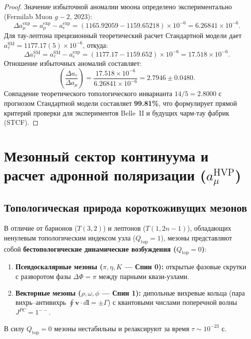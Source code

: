 \documentclass[12pt,a4paper]{article}
\begin{document}
\begin{proof}
Значение избыточной аномалии мюона определено экспериментально (Fermilab Muon $g-2$, 2023):
	\begin{equation}
	\Delta a_\mu^{\text{exp}} = a_\mu^{\text{exp}} - a_e^{\text{exp}} = (1165.92059 - 1159.65218) \times 10^{-6} = 6.26841 \times 10^{-6}.
	\end{equation}
	Для тау-лептона прецизионный теоретический расчет Стандартной модели дает $a_\tau^{\text{SM}} = 1177.17(5) \times 10^{-6}$, откуда:
	\begin{equation}
	\Delta a_\tau^{\text{SM}} = a_\tau^{\text{SM}} - a_e^{\text{exp}} = (1177.17 - 1159.652) \times 10^{-6} = 17.518 \times 10^{-6}.
\end{equation}
Отношение избыточных аномалий составляет:
	\begin{equation}
	\left( \frac{\Delta a_\tau}{\Delta a_\mu} \right) = \frac{17.518 \times 10^{-6}}{6.26841 \times 10^{-6}} = \mathbf{2.7946 \pm 0.0480}.
	\end{equation}
	Совпадение теоретического топологического инварианта $14/5 = 2.8000$ с прогнозом Стандартной модели составляет \textbf{99.81\%}, что формулирует прямой критерий проверки для экспериментов Belle~II и будущих чарм-тау фабрик (STCF).
	\end{proof}
	
\section{Мезонный сектор континуума и расчет адронной поляризации ($a_\mu^{\text{HVP}}$)}
	
	\subsection{Топологическая природа короткоживущих мезонов}
	В отличие от барионов ($T(3,2)$) и лептонов ($T(1, 2n-1)$), обладающих ненулевым топологическим индексом узла ($Q_{\text{top}} = 1$), мезоны представляют собой \textbf{бестопологические динамические возбуждения ($Q_{\text{top}} = 0$)}:
	\begin{enumerate}
		\item \textbf{Псевдоскалярные мезоны ($\pi, \eta, K$ --- Спин 0):} открытые фазовые скрутки с разворотом фазы $\Delta \Phi = \pi$ между парными квази-узлами.
		\item \textbf{Векторные мезоны ($\rho, \omega, \phi$ --- Спин 1):} дипольные вихревые кольца (пара вихрь--антивихрь $\oint \mathbf{v} \cdot d\mathbf{l} = \pm \Gamma$) с квантовыми числами поперечной волны $J^{PC} = 1^{--}$.
	\end{enumerate}
	В силу $Q_{\text{top}} = 0$ мезоны нестабильны и релаксируют за время $\tau \sim 10^{-23}$ с.
	
\end{document}

